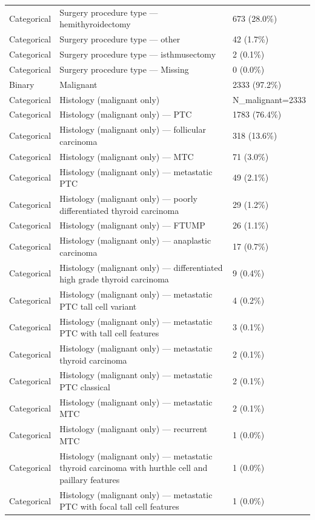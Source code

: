 \begin{table}[htbp]
\begin{tabular}{lll}
Categorical & Surgery procedure type — hemithyroidectomy & 673 (28.0\%) \\
Categorical & Surgery procedure type — other & 42 (1.7\%) \\
Categorical & Surgery procedure type — isthmusectomy & 2 (0.1\%) \\
Categorical & Surgery procedure type — Missing & 0 (0.0\%) \\
Binary & Malignant & 2333 (97.2\%) \\
Categorical & Histology (malignant only) & N\_malignant=2333 \\
Categorical & Histology (malignant only) — PTC & 1783 (76.4\%) \\
Categorical & Histology (malignant only) — follicular carcinoma & 318 (13.6\%) \\
Categorical & Histology (malignant only) — MTC & 71 (3.0\%) \\
Categorical & Histology (malignant only) — metastatic PTC & 49 (2.1\%) \\
Categorical & Histology (malignant only) — poorly differentiated thyroid carcinoma & 29 (1.2\%) \\
Categorical & Histology (malignant only) — FTUMP & 26 (1.1\%) \\
Categorical & Histology (malignant only) — anaplastic carcinoma & 17 (0.7\%) \\
Categorical & Histology (malignant only) — differentiated high grade thyroid carcinoma & 9 (0.4\%) \\
Categorical & Histology (malignant only) — metastatic PTC tall cell variant & 4 (0.2\%) \\
Categorical & Histology (malignant only) — metastatic PTC with tall cell features & 3 (0.1\%) \\
Categorical & Histology (malignant only) — metastatic thyroid carcinoma & 2 (0.1\%) \\
Categorical & Histology (malignant only) — metastatic PTC classical & 2 (0.1\%) \\
Categorical & Histology (malignant only) — metastatic MTC & 2 (0.1\%) \\
Categorical & Histology (malignant only) — recurrent MTC & 1 (0.0\%) \\
Categorical & Histology (malignant only) — metastatic thyroid carcinoma with hurthle cell and paillary features & 1 (0.0\%) \\
Categorical & Histology (malignant only) — metastatic PTC with focal tall cell features & 1 (0.0\%) \\

\end{tabular}
\end{table}
